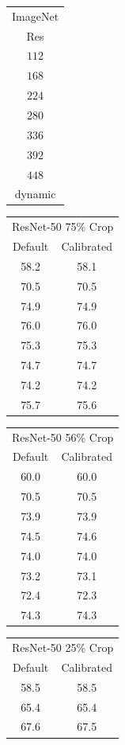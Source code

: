 \begin{table}
    \begin{tabular}{c|}
    ImageNet\\
    Res \\
    \hline
    $112$ \\ 
    $168$ \\ 
    $224$ \\ 
    $280$ \\ 
    $336$ \\ 
    $392$ \\ 
    $448$ \\
    dynamic\\
    \end{tabular}
    \begin{tabular}{|c|c|}
    \multicolumn{2}{|c|}{ ResNet-50 75\% Crop}\\
    Default & Calibrated \\
    \hline
    58.2 & 58.1\\
    70.5 & 70.5\\ 
    74.9 & 74.9\\ 
    76.0 & 76.0\\ 
    75.3 & 75.3\\ 
    74.7 & 74.7\\ 
    74.2 & 74.2\\
    75.7 & 75.6\\ 
    \end{tabular}
    \begin{tabular}{|c|c|}
    \multicolumn{2}{|c|}{ ResNet-50 56\% Crop}\\
    Default & Calibrated  \\
    \hline
    60.0 & 60.0\\ 
    70.5 & 70.5\\ 
    73.9 & 73.9\\ 
    74.5 & 74.6\\ 
    74.0 & 74.0\\ 
    73.2 & 73.1\\ 
    72.4 & 72.3\\
    74.3 & 74.3 \\ 
    \end{tabular}
    \begin{tabular}{|c|c|}
    \multicolumn{2}{|c|}{ ResNet-50 25\% Crop}\\
    Default & Calibrated  \\
    \hline
    58.5 & 58.5 \\ 
    65.4 & 65.4\\ 
    67.6 & 67.5\\ 

\end{tabular}
\end{table}
